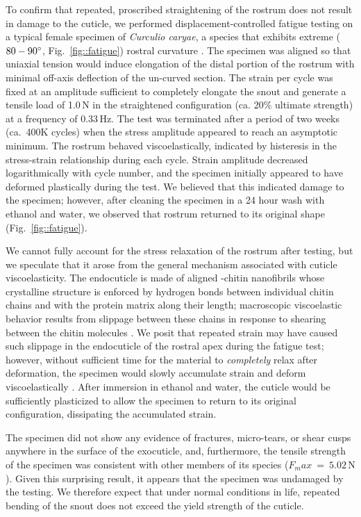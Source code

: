 \documentclass[twocolumn, linenumbers, superscriptaddress, nofootinbib]{revtex4-1}
\begin{document}
		To confirm that repeated, proscribed straightening of the rostrum does not result in damage to the cuticle, we performed displacement-controlled fatigue testing on a typical female specimen of \textit{Curculio caryae}, a species that exhibits extreme ($80-90\degree$, Fig.~\ref{fig::fatigue}) rostral curvature \cite{AguirreUribe1978, Gibson1969}.
		The specimen was aligned so that uniaxial tension would induce elongation of the distal portion of the rostrum with minimal off-axis deflection of the un-curved section.
		The strain per cycle was fixed at an amplitude sufficient to completely elongate the snout and generate a tensile load of 1.0\,N  in the straightened configuration (ca. 20\% ultimate strength) at a frequency of $0.33\,\text{Hz}$.
		The test was terminated after a period of two weeks (ca.~400K cycles) when the stress amplitude appeared to reach an asymptotic minimum.		
		The rostrum behaved viscoelastically, indicated by histeresis in the stress-strain relationship during each cycle.
		Strain amplitude decreased logarithmically with cycle number, and the specimen initially appeared to have deformed plastically during the test.
		We believed that this indicated damage to the specimen; however, after cleaning the specimen in a 24 hour wash with ethanol and water, we observed that rostrum returned to its original shape (Fig.~\ref{fig::fatigue}).
		
		We cannot fully account for the stress relaxation of the rostrum after testing, but we speculate that it arose from the general mechanism associated with cuticle viscoelasticity.
		The endocuticle is made of aligned \textalpha-chitin nanofibrils whose crystalline structure is enforced by hydrogen bonds between individual chitin chains and with the protein matrix along their length; macroscopic viscoelastic behavior results from slippage between these chains in response to shearing between the chitin molecules \cite{Vincent2004, Evans1967, Sun2012}.
		We posit that repeated strain may have caused such slippage in the endocuticle of the rostral apex during the fatigue test; however, without sufficient time for the material to \textit{completely} relax after deformation, the specimen would slowly accumulate strain and deform viscoelastically \cite{Munster2013}.
		After immersion in ethanol and water, the cuticle would be sufficiently plasticized to allow the specimen to return to its original configuration, dissipating the accumulated strain.
		
		The specimen did not show any evidence of fractures, micro-tears, or shear cusps anywhere in the surface of the exocuticle, and, furthermore, the tensile strength of the specimen was consistent with other members of its species ($F_max~=~5.02\,\text{N}$).
		Given this surprising result, it appears that the specimen was undamaged by the testing.
		We therefore expect that under normal conditions in life, repeated bending of the snout does not exceed the yield strength of the cuticle.
			
\end{document}
